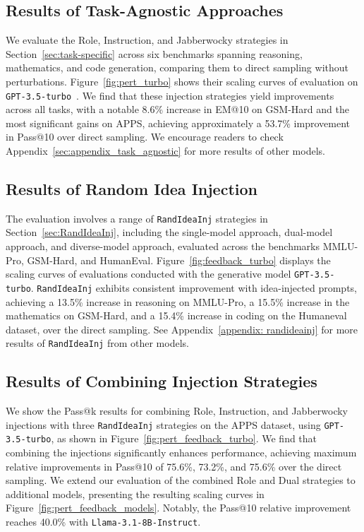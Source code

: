  
\subsection{Results of Task-Agnostic Approaches}


We evaluate the Role, Instruction, and Jabberwocky strategies in Section~\ref{sec:task-specific} across six benchmarks spanning reasoning, mathematics, and code generation, comparing them to direct sampling without perturbations. Figure~\ref{fig:pert_turbo} shows their scaling curves of evaluation on \texttt{GPT-3.5-turbo}~\cite{openai2023gpt35turbo}.  
We find that these injection strategies yield improvements across all tasks, with a notable 8.6\% increase in EM@10 on GSM-Hard and the most significant gains on APPS, achieving approximately a 53.7\% improvement in Pass@10 over direct sampling. We encourage readers to check Appendix~\ref{sec:appendix_task_agnostic} for more results of other models.






\subsection{Results of Random Idea Injection} 
The evaluation involves a range of \texttt{RandIdeaInj} strategies in Section~\ref{sec:RandIdeaInj}, including the single-model approach, dual-model approach, and diverse-model approach, evaluated across the benchmarks MMLU-Pro, GSM-Hard, and HumanEval. Figure~\ref{fig:feedback_turbo} displays the scaling curves of evaluations conducted with the generative model \texttt{GPT-3.5-turbo}. \texttt{RandIdeaInj} exhibits consistent improvement with idea-injected prompts, achieving a 13.5\% increase in reasoning on MMLU-Pro, a 15.5\% increase in the mathematics on GSM-Hard, and a 15.4\% increase in coding on the Humaneval dataset, over the direct sampling. See Appendix~\ref{appendix: randideainj} for more results of \texttt{RandIdeaInj} from other models.


\subsection{Results of Combining Injection Strategies} 
We show the Pass@k results for combining Role, Instruction, and Jabberwocky injections with three \texttt{RandIdeaInj} strategies on the APPS dataset, using \texttt{GPT-3.5-turbo}, as shown in Figure~\ref{fig:pert_feedback_turbo}.  We find that combining the injections significantly enhances performance, achieving maximum relative improvements in Pass@10 of 75.6\%, 73.2\%, and 75.6\% over the direct sampling. We extend our evaluation of the combined Role and Dual strategies to additional models, presenting the resulting scaling curves in Figure~\ref{fig:pert_feedback_models}. Notably, the Pass@10 relative improvement reaches 40.0\% with \texttt{Llama-3.1-8B-Instruct}.

